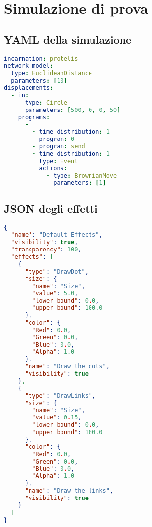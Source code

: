 
\appendix
    \chapter{Simulazione di prova}\label{app:test}
        \section{YAML della simulazione}\label{app:yaml}
\begin{lstlisting}[language=yaml]
incarnation: protelis
network-model:
  type: EuclideanDistance
  parameters: [10]
displacements:
  - in:
      type: Circle
      parameters: [500, 0, 0, 50]
    programs:
      -
        - time-distribution: 1
          program: 0
        - program: send
        - time-distribution: 1
          type: Event
          actions:
            - type: BrownianMove
              parameters: [1]
\end{lstlisting}
\clearpage
        \section{JSON degli effetti}\label{app:json}
\begin{lstlisting}[language=json]
{
  "name": "Default Effects",
  "visibility": true,
  "transparency": 100,
  "effects": [
    {
      "type": "DrawDot",
      "size": {
        "name": "Size",
        "value": 5.0,
        "lower bound": 0.0,
        "upper bound": 100.0
      },
      "color": {
        "Red": 0.0,
        "Green": 0.0,
        "Blue": 0.0,
        "Alpha": 1.0
      },
      "name": "Draw the dots",
      "visibility": true
    },
    {
      "type": "DrawLinks",
      "size": {
        "name": "Size",
        "value": 0.15,
        "lower bound": 0.0,
        "upper bound": 100.0
      },
      "color": {
        "Red": 0.0,
        "Green": 0.0,
        "Blue": 0.0,
        "Alpha": 1.0
      },
      "name": "Draw the links",
      "visibility": true
    }
  ]
}
\end{lstlisting}

